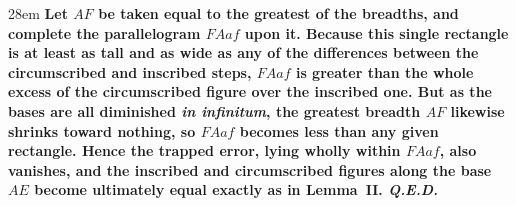\documentclass[border=4pt]{standalone}
\begin{document}
\begin{varwidth}{28em}
\large\bfseries
Let \textcolor{widthorange}{$AF$} be taken equal to the greatest of the breadths, and complete \textcolor{boundred}{the parallelogram $FAaf$} upon it. Because this single rectangle is at least as tall and as wide as any of the differences between the circumscribed and inscribed steps, \textcolor{boundred}{$FAaf$} is greater than the whole excess of the circumscribed figure over the inscribed one. But as the bases are all diminished \emph{in infinitum}, \textcolor{widthorange}{the greatest breadth $AF$} likewise shrinks toward nothing, so \textcolor{boundred}{$FAaf$} becomes less than any given rectangle. Hence the trapped error, lying wholly within \textcolor{boundred}{$FAaf$}, also vanishes, and \textcolor{stepblue}{the inscribed} and circumscribed figures along \textcolor{basegreen}{the base $AE$} become ultimately equal exactly as in \textbf{Lemma~II}. \textit{Q.E.D.}
\end{varwidth}
\end{document}
